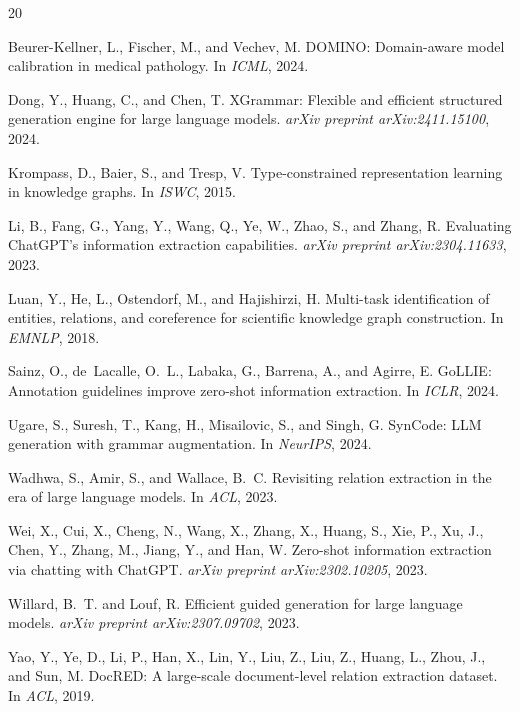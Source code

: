 \documentclass[11pt,a4paper]{article}
\begin{document}

\begin{thebibliography}{20}

Beurer-Kellner, L., Fischer, M., and Vechev, M.
\newblock DOMINO: Domain-aware model calibration in medical pathology.
\newblock In \emph{ICML}, 2024.

Dong, Y., Huang, C., and Chen, T.
\newblock XGrammar: Flexible and efficient structured generation engine for large language models.
\newblock \emph{arXiv preprint arXiv:2411.15100}, 2024.

Krompass, D., Baier, S., and Tresp, V.
\newblock Type-constrained representation learning in knowledge graphs.
\newblock In \emph{ISWC}, 2015.

Li, B., Fang, G., Yang, Y., Wang, Q., Ye, W., Zhao, S., and Zhang, R.
\newblock Evaluating ChatGPT's information extraction capabilities.
\newblock \emph{arXiv preprint arXiv:2304.11633}, 2023.

Luan, Y., He, L., Ostendorf, M., and Hajishirzi, H.
\newblock Multi-task identification of entities, relations, and coreference for scientific knowledge graph construction.
\newblock In \emph{EMNLP}, 2018.

Sainz, O., de~Lacalle, O.~L., Labaka, G., Barrena, A., and Agirre, E.
\newblock GoLLIE: Annotation guidelines improve zero-shot information extraction.
\newblock In \emph{ICLR}, 2024.

Ugare, S., Suresh, T., Kang, H., Misailovic, S., and Singh, G.
\newblock SynCode: LLM generation with grammar augmentation.
\newblock In \emph{NeurIPS}, 2024.

Wadhwa, S., Amir, S., and Wallace, B.~C.
\newblock Revisiting relation extraction in the era of large language models.
\newblock In \emph{ACL}, 2023.

Wei, X., Cui, X., Cheng, N., Wang, X., Zhang, X., Huang, S., Xie, P., Xu, J., Chen, Y., Zhang, M., Jiang, Y., and Han, W.
\newblock Zero-shot information extraction via chatting with ChatGPT.
\newblock \emph{arXiv preprint arXiv:2302.10205}, 2023.

Willard, B.~T. and Louf, R.
\newblock Efficient guided generation for large language models.
\newblock \emph{arXiv preprint arXiv:2307.09702}, 2023.

Yao, Y., Ye, D., Li, P., Han, X., Lin, Y., Liu, Z., Liu, Z., Huang, L., Zhou, J., and Sun, M.
\newblock DocRED: A large-scale document-level relation extraction dataset.
\newblock In \emph{ACL}, 2019.

\end{thebibliography}
\end{document}
